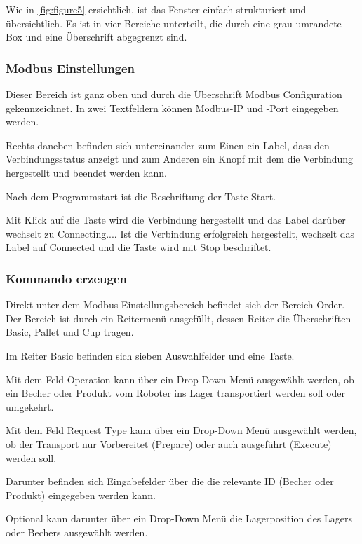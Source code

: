 Wie in \ref{fig:figure5} ersichtlich, ist das Fenster einfach strukturiert und übersichtlich.
Es ist in vier Bereiche unterteilt, die durch eine grau umrandete Box und eine Überschrift abgegrenzt sind.

\subsubsection{Modbus Einstellungen}

Dieser Bereich ist ganz oben und durch die Überschrift \glqq Modbus Configuration\grqq{} gekennzeichnet.
In zwei Textfeldern können Modbus-IP und -Port eingegeben werden. 

Rechts daneben befinden sich untereinander zum Einen ein Label, dass den Verbindungsstatus anzeigt und zum Anderen
ein Knopf mit dem die Verbindung hergestellt und beendet werden kann.

Nach dem Programmstart ist die Beschriftung der Taste \glqq Start\grqq{}.

Mit Klick auf die Taste wird die Verbindung hergestellt und das Label darüber wechselt zu \glqq Connecting...\grqq{}.
Ist die Verbindung erfolgreich hergestellt, wechselt das Label auf \glqq Connected\grqq{} und die Taste wird mit
\glqq Stop\grqq{} beschriftet.

\subsubsection{Kommando erzeugen}

Direkt unter dem Modbus Einstellungsbereich befindet sich der Bereich \glqq Order\grqq{}.
Der Bereich ist durch ein Reitermenü ausgefüllt, dessen Reiter die Überschriften
\glqq Basic\grqq{}, \glqq Pallet\grqq{} und \glqq Cup\grqq{} tragen.

Im Reiter \glqq Basic\grqq{} befinden sich sieben Auswahlfelder und eine Taste.

Mit dem Feld \glqq Operation\grqq{} kann über ein Drop-Down Menü ausgewählt werden, ob ein Becher oder Produkt vom Roboter ins Lager transportiert werden soll oder umgekehrt.

Mit dem Feld \glqq Request Type\grqq{} kann über ein Drop-Down Menü ausgewählt werden, ob der Transport nur Vorbereitet (\glqq Prepare\grqq{}) oder auch ausgeführt (\glqq Execute\grqq{}) werden soll.

Darunter befinden sich Eingabefelder über die die relevante ID (Becher oder Produkt) eingegeben werden kann.

Optional kann darunter über ein Drop-Down Menü die Lagerposition des Lagers oder Bechers ausgewählt werden.



